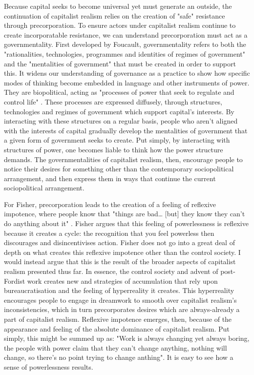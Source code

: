 Because capital seeks to become universal yet must generate an outside, the continuation of capitalist realism relies on the creation of "safe" resistance through precorporation. To ensure actors under capitalist realism continue to create incorporatable resistance, we can understand precorporation must act as a governmentality. First developed by Foucault, governmentality refers to both the "rationalities, technologies, programmes and identities of regimes of government" and the "mentalities of government" \citep[p. 24]{dean_governmentality_2010} that must be created in order to support this. It widens our understanding of governance as a practice to show how specific modes of thinking become embedded in language and other instruments of power.  They are biopolitical, acting as "processes of power that seek to regulate and control life" \citep[p. 50]{lemke_biopolitics_2011}. These processes are expressed diffusely, through structures, technologies and regimes of government which support capital's interests. By interacting with these structures on a regular basis, people who aren't aligned with the interests of capital gradually develop the mentalities of government that a given form of government seeks to create. Put simply, by interacting with structures of power, one becomes liable to think how the power structure demands. The governmentalities of capitalist realism, then, encourage people to notice their desires for something other than the contemporary sociopolitical arrangement, and then express them in ways that continue the current sociopolitical arrangement. 


For Fisher, precorporation leads to the creation of a feeling of reflexive impotence, where people know that "things are bad\ldots{} [but] they know they can't do anything about it" \citep[p. 24]{fisher_capitalist_2009}. Fisher argues that this feeling of powerlessness is reflexive because it creates a cycle: the recognition that you feel powerless then discourages and disincentivises action. Fisher does not go into a great deal of depth on what creates this reflexive impotence other than the control society. I would instead argue that this is the result of the broader aspects of capitalist realism presented thus far. In essence, the control society and advent of post-Fordist work creates new  and strategies of accumulation that rely upon bureaucratisation and the feeling of hyperreality it creates. This hyperreality encourages people to engage in dreamwork to smooth over capitalist realism's inconsistencies, which in turn precorporates desires which are always-already a part of capitalist realism. Reflexive impotence emerges, then, because of the appearance and feeling of the absolute dominance of capitalist realism. Put simply, this might be summed up as: "Work is always changing yet always boring, the people with power claim that they can't change anything, nothing will change, so there's no point trying to change anthing". It is easy to see how a sense of powerlessness results.

